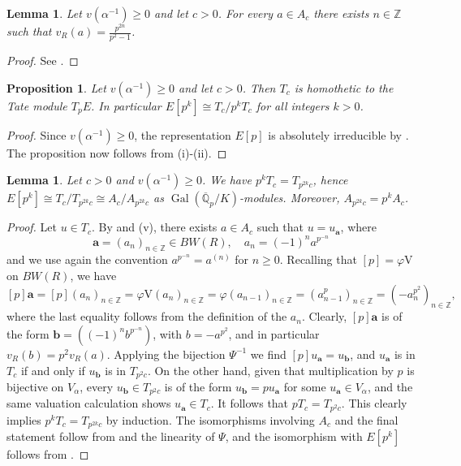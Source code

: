 \documentclass{amsart}
\newtheorem{lemma}[theorem]{Lemma}
\newtheorem{proposition}[theorem]{Proposition}
\theoremstyle{definition}
\numberwithin{theorem}{section}
\numberwithin{equation}{section}
\begin{document}
\begin{lemma}\label{lemma: valuations of elements in Ac}
    Let $v(\alpha^{-1}) \geq 0$ and let $c>0$. For every $a \in A_c$ there exists $n \in \mathbb{Z}$ such that $v_R(a) = \frac{p^{2n}}{p^2-1}$.
\end{lemma}

\begin{proof}
   See \cite[top of p.~128]{Volkov}.
\end{proof}

\begin{proposition}\label{prop: Tc is TpE}
Let $v(\alpha^{-1}) \geq 0$ and let $c>0$. Then $T_c$ is homothetic to the Tate module $T_pE$. In particular $E[p^k] \cong T_c/p^kT_c$ for all integers $k>0$.
\end{proposition}

\begin{proof}
    Since $v(\alpha^{-1})\geq 0$, the representation $E[p]$ is absolutely irreducible by \cite[bottom of p.~129]{Volkov}. The proposition now follows from (i)-(ii).
\end{proof}


\begin{lemma}\label{lem: Tc vs Tp}
    Let $c>0$ and $v(\alpha^{-1})\geq 0$. We have $p^{k}T_{c}=T_{p^{2k}c}$, hence $E[p^k] \cong  T_c/T_{p^{2k}c} \cong A_c/A_{p^{2k}c}$ as $\operatorname{Gal}(\overline{\mathbb{Q}}_p/K)$-modules. Moreover, $A_{p^{2k}c}=p^kA_c$.
\end{lemma}

\begin{proof}
        
Let $u \in T_c$. By  and (v), there exists $a \in A_c$ such that $u=u_{\mathbf{a}}$, where 
\[
\mathbf{a}=(a_n)_{n \in \mathbb{Z}} \in BW(R), \quad a_n = (-1)^n a^{p^{-n}}
\]
and we use again the convention $a^{p^{-n}}=a^{(n)}$ for $n \geq 0$. Recalling that $[p] = \varphi \text{V}$ on $BW(R)$, we have
\[
[p] \mathbf{a} = [p](a_n)_{n \in \mathbb{Z}} = \varphi \text{V} (a_n)_{n \in \mathbb{Z}}= \varphi (a_{n-1})_{n \in \mathbb{Z}} = (a_{n-1}^p)_{n \in \mathbb{Z}} = ( -a_{n}^{p^2} )_{n \in \mathbb{Z}},
\]
where the last equality follows from the definition of the $a_n$.
Clearly, $[p] \mathbf{a}$ is of the form $\mathbf{b} = \left( (-1)^n b^{p^{-n}} \right)$, with $b=-a^{p^2}$, and in particular $v_R(b)=p^2v_R(a)$. Applying the bijection $\Psi^{-1}$ we find $[p]u_{\mathbf{a}}=u_{\mathbf{b}}$, and $u_{\mathbf{a}}$ is in $T_c$ if and only if $u_{\mathbf{b}}$ is in $T_{p^2c}$. On the other hand, given that multiplication by $p$ is bijective on $V_\alpha$, every $u_\mathbf{b} \in T_{p^2c}$ is of the form $u_\mathbf{b} = p u_\mathbf{a}$ for some $u_\mathbf{a} \in V_\alpha$, and the same valuation calculation shows $u_\mathbf{a} \in T_c$.
It follows that $pT_c = T_{p^2c}$. 
This clearly implies $p^kT_c=T_{p^{2k}c}$ by induction. The isomorphisms involving $A_c$ and the final statement follow from  and the linearity of $\Psi$, and the isomorphism with $E[p^k]$ follows from .
\end{proof}
\end{document}
